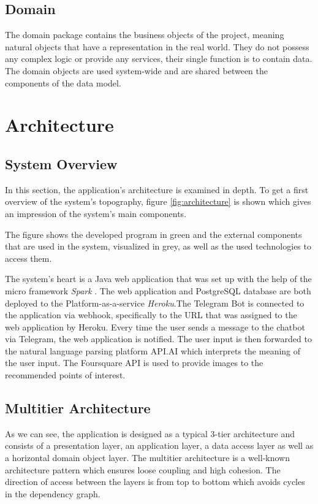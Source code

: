 
\subsection{Domain}
The domain package contains the business objects of the project, meaning natural objects that have a representation in the real world. They do not possess any complex logic or provide any services, their single function is to contain data. The domain objects are used system-wide and are shared between the components of the data model.

\section{Architecture}
\subsection{System Overview}
In this section, the application’s architecture is examined in depth. To get a first overview of the system’s topography, figure \ref{fig:architecture} is shown which gives an impression of the system's main components.

The figure shows the developed program in green and the external components that are used in the system, visualized in grey, as well as the used technologies to access them. 


The system's heart is a Java web application that was set up with the help of the micro framework \textit{Spark}  \cite{spark}. The web application and PostgreSQL database are both deployed to the Platform-as-a-service \textit{Heroku}.The Telegram Bot is connected to the application via webhook, specifically to the URL that was assigned to the web application by Heroku. Every time the user sends a message to the chatbot via Telegram, the web application is notified. The user input is then forwarded to the natural language
parsing platform API.AI which interprets the meaning of the user input. The Foursquare API is used to provide images to the recommended points of interest.

\subsection{Multitier Architecture}

As we can see, the application is designed as a typical 3-tier architecture and consists of a presentation layer, an application layer, a data access layer as well as a horizontal domain object layer. The multitier architecture is a well-known architecture pattern which ensures loose coupling and high cohesion. The direction of access between the layers is from top to bottom which avoids cycles in the dependency graph.

